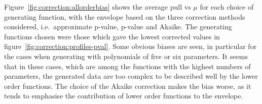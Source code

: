 Figure~\ref{fig:correction:allorderbias} shows the average pull vs $\mu$
for each choice of generating function, with the envelope based on the
three correction methods considered, i.e.~approximate p-value, p-value
and Akaike.
The generating functions chosen were those
which gave the lowest corrected \nll values in
figure~\ref{fig:correction:profiles-pval}.
Some obvious biases are seen, in particular for the cases when
generating with polynomials of five or six parameters. It seems that in these
cases, which are among the functions with the highest numbers of parameters,
the generated data are too complex to be described well by the lower order
functions. The choice of the Akaike correction makes the bias worse, as it
tends to emphasise the contribution of lower order functions to the envelope.

